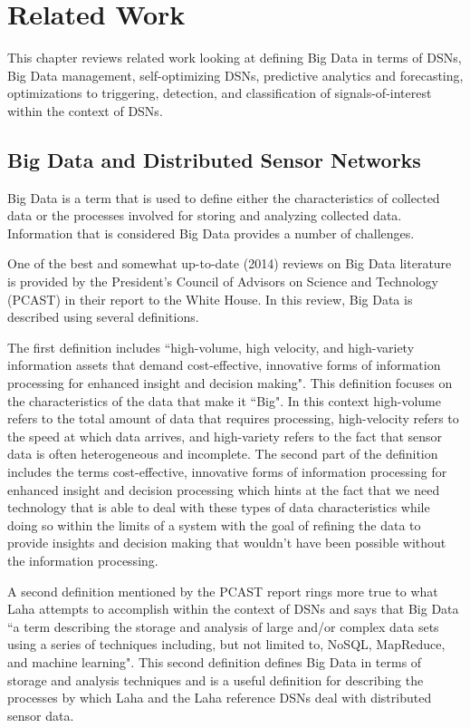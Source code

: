 \chapter{Related Work}
This chapter reviews related work looking at defining Big Data in terms of DSNs, Big Data management, self-optimizing DSNs, predictive analytics and forecasting, optimizations to triggering, detection, and classification of signals-of-interest within the context of DSNs.

\section{Big Data and Distributed Sensor Networks}
Big Data is a term that is used to define either the characteristics of collected data or the processes involved for storing and analyzing collected data. Information that is considered Big Data provides a number of challenges.

One of the best and somewhat up-to-date (2014) reviews on Big Data literature is provided by the President’s Council of Advisors on Science and Technology (PCAST) in their report to the White House\cite{house2014big}. In this review, Big Data is described using several definitions. 

The first definition includes ``high-volume, high velocity, and high-variety information assets that demand cost-effective, innovative forms of information processing for enhanced insight and decision making"\cite{gartner_it_glossary_2016}. This definition focuses on the characteristics of the data that make it ``Big". In this context high-volume refers to the total amount of data that requires processing, high-velocity refers to the speed at which data arrives, and high-variety refers to the fact that sensor data is often heterogeneous and incomplete. The second part of the definition includes the terms cost-effective, innovative forms of information processing for enhanced insight and decision processing which hints at the fact that we need technology that is able to deal with these types of data characteristics while doing so within the limits of a system with the goal of refining the data to provide insights and decision making that wouldn't have been possible without the information processing. 

A second definition\cite{ward2013undefined}  mentioned by the PCAST report rings more true to what Laha attempts to accomplish within the context of DSNs and says that Big Data ``a term describing the storage and analysis of large and/or complex data sets using a series of techniques including, but not limited to, NoSQL, MapReduce, and machine learning". This second definition defines Big Data in terms of storage and analysis techniques and is a useful definition for describing the processes by which Laha and the Laha reference DSNs deal with distributed sensor data.


